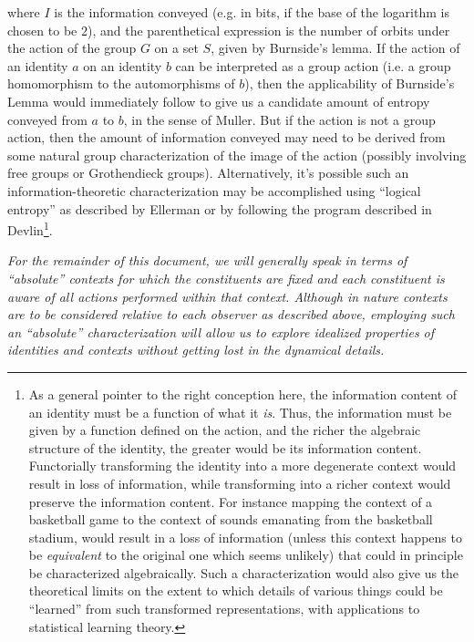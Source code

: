 \documentclass[pra,twocolumn,groupedaddress,10pt]{revtex4}
\theoremstyle{definition}
\begin{document}
where $I$ is the information conveyed (e.g. in bits, if the base of the logarithm is chosen to be $2$), and the parenthetical expression is the number of orbits under the action of the group $G$ on a set $S$, given by Burnside's lemma. If the action of an identity $a$ on an identity $b$ can be interpreted as a group action (i.e. a group homomorphism to the automorphisms of $b$), then the applicability of Burnside's Lemma would immediately follow to give us a candidate amount of entropy conveyed from $a$ to $b$, in the sense of Muller. But if the action is not a group action, then the amount of information conveyed may need to be derived from some natural group characterization of the image of the action (possibly involving free groups or Grothendieck groups\cite{grogroup}). Alternatively, it's possible such an information-theoretic characterization may be accomplished using ``logical entropy'' as described by Ellerman\cite{ellerman} or by following the program described in Devlin\cite{devlin}\footnote{As a general pointer to the right conception here, the information content of an identity must be a function of what it \emph{is}. Thus, the information must be given by a function defined on the action, and the richer the algebraic structure of the identity, the greater would be its information content. Functorially transforming the identity into a more degenerate context would result in loss of information, while transforming into a richer context would preserve the information content. For instance mapping the context of a basketball game to the context of sounds emanating from the basketball stadium, would result in a loss of information (unless this context happens to be \emph{equivalent} to the original one which seems unlikely) that could in principle be characterized algebraically. Such a characterization would also give us the theoretical limits on the extent to which details of various things could be ``learned'' from such transformed representations, with applications to statistical learning theory.}.

\textit{For the remainder of this document, we will generally speak in terms of ``absolute'' contexts for which the constituents are fixed and each constituent is aware of all actions performed within that context. Although in nature contexts are to be considered relative to each observer as described above, employing such an ``absolute'' characterization will allow us to explore idealized properties of identities and contexts without getting lost in the dynamical details.}
\end{document}
